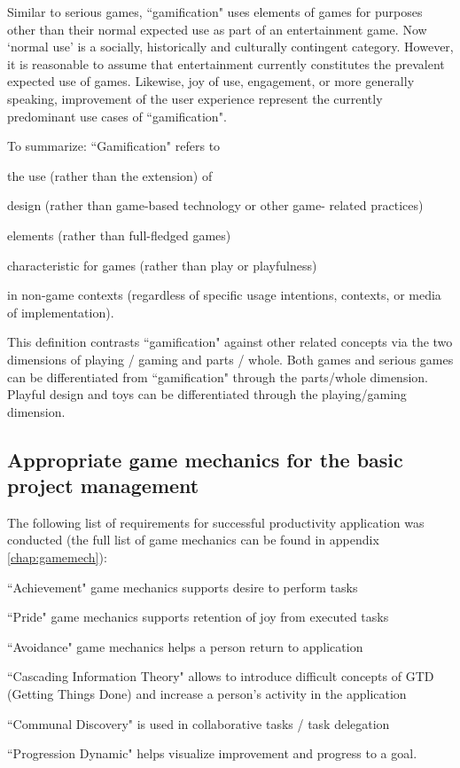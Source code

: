 Similar to serious games, ``gamification" uses elements of games for purposes other than their normal expected use as part of an entertainment game. Now `normal use' is a socially, historically and culturally contingent category. However, it is reasonable to assume that entertainment currently constitutes the prevalent expected use of games. Likewise, joy of use, engagement, or more generally speaking, improvement of the user experience represent the currently predominant use cases of ``gamification".

To summarize: ``Gamification" refers to
\begin{compactitem}
\item the use (rather than the extension) of
\item design (rather than game-based technology or other game-
related practices)
\item elements (rather than full-fledged games)
\item characteristic for games (rather than play or playfulness)
\item in non-game contexts (regardless of specific usage intentions, contexts, or media of implementation).
\end{compactitem}


This definition contrasts ``gamification" against other related concepts via the two dimensions of playing / gaming and parts / whole. Both games and serious games can be differentiated from ``gamification" through the parts/whole dimension. Playful design and toys can be differentiated through the playing/gaming dimension.


\subsection{Appropriate game mechanics for the basic project management}

The following list of requirements for successful productivity application was conducted (the full list of game mechanics can be found in appendix \ref{chap:gamemech}):

\begin{compactitem}
\item ``Achievement" game mechanics supports desire to perform tasks
\item ``Pride" game mechanics supports retention of joy from executed tasks
\item ``Avoidance" game mechanics helps a person return to application
\item ``Cascading Information Theory" allows to introduce difficult concepts of GTD (Getting Things Done) and increase a person’s activity in the application
\item ``Communal Discovery" is used in collaborative tasks / task delegation
\item ``Progression Dynamic" helps visualize improvement and progress to a goal.
\end{compactitem}

